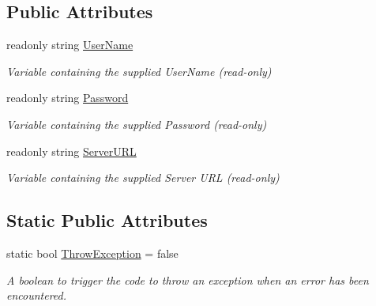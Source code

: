 \subsection*{Public Attributes}
\begin{DoxyCompactItemize}
\item 
readonly string \mbox{\hyperlink{class_connector_a41d247f09774f0ed206ce1a4a2463fed}{User\+Name}}
\begin{DoxyCompactList}\small\item\em Variable containing the supplied User\+Name (read-\/only) \end{DoxyCompactList}\item 
readonly string \mbox{\hyperlink{class_connector_a7dd469898462ef761d256392766461fe}{Password}}
\begin{DoxyCompactList}\small\item\em Variable containing the supplied Password (read-\/only) \end{DoxyCompactList}\item 
readonly string \mbox{\hyperlink{class_connector_ac0cae400459978dde8030f75208e48f1}{Server\+U\+RL}}
\begin{DoxyCompactList}\small\item\em Variable containing the supplied Server U\+RL (read-\/only) \end{DoxyCompactList}\end{DoxyCompactItemize}
\subsection*{Static Public Attributes}
\begin{DoxyCompactItemize}
\item 
static bool \mbox{\hyperlink{class_connector_a8ec0dcdbb4a85a56fa50f67686484c19}{Throw\+Exception}} = false
\begin{DoxyCompactList}\small\item\em A boolean to trigger the code to throw an exception when an error has been encountered. \end{DoxyCompactList}\end{DoxyCompactItemize}

